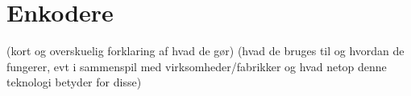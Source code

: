 \section{Enkodere}
\label{sec:enkodere}
(kort og overskuelig forklaring af hvad de gør)
(hvad de bruges til og hvordan de fungerer, evt i sammenspil med virksomheder/fabrikker og hvad netop denne teknologi betyder for disse)
